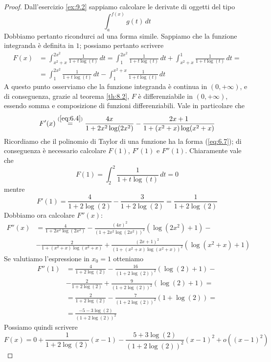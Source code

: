 \begin{proof}
    Dall'esercizio \ref{ex:9.2} sappiamo calcolare le derivate di oggetti del tipo
    \[
    \int_{a}^{f(x)} g(t)\, dt
    \]
    Dobbiamo pertanto ricondurci ad una forma simile. Sappiamo che la funzione integranda è definita in $1$; possiamo pertanto scrivere
    \[
    \begin{split}
        F(x) & = \int_{x^2+x}^{2x^2}\frac{1}{1+t\log(t)}\, dt = \int_{1}^{2x^2}\frac{1}{1+t\log(t)}\, dt + \int_{x^2+x}^1\frac{1}{1+t\log(t)}\, dt = \\
        & = \int_1^{2x^2} \frac{1}{1+t\log(t)}\, dt -\int_1^{x^2+x}\frac{1}{1+t\log(t)}\, dt
    \end{split}
    \]
    A questo punto osserviamo che la funzione integranda è continua in $(0,+\infty)$, e di conseguenza, grazie al teorema \ref{th:8.2}, $F$ è differenziabile in $(0,+\infty)$, essendo somma e composizione di funzioni differenziabili. Vale in particolare che
    \[
    F'(x) \overset{(\ref{eq:6.4})}{=} \frac{4x}{1+2x^2\log(2x^2)} -\frac{2x+1}{1+(x^2+x)\log(x^2+x)}
    \]
    Ricordiamo che il polinomio di Taylor di una funzione ha la forma (\ref{eq:6.7}); di conseguenza è necessario calcolare $F(1)$, $F'(1)$ e $F''(1)$. Chiaramente vale che
    \[
    F(1) = \int_2^2 \frac{1}{1+t\log(t)}\, dt = 0
    \]
    mentre
    \[
    F'(1) = \frac{4}{1+2\log(2)}-\frac{3}{1+2\log(2)} = \frac{1}{1+2\log(2)}
    \]
    Dobbiamo ora calcolare $F''(x)$:
    \[
    \begin{split}
        F''(x) & = \frac{4}{1+2x^2\log(2x^2)}-\frac{(4x)^2}{(1+2x^2\log(2x^2))^2}\left(\log(2x^2)+1\right)- \\
        & - \frac{2}{1+(x^2+x)\log(x^2+x)}+\frac{(2x+1)^2}{(1+(x^2+x)\log(x^2+x))^2}\left(\log(x^2+x)+1\right)
    \end{split}
    \]
    Se valutiamo l'espressione in $x_0=1$ otteniamo
    \[
    \begin{split}
        F''(1) & = \frac{4}{1+2\log(2)}-\frac{16}{(1+2\log(2))^2}(\log(2)+1)-\\
        & - \frac{2}{1+2\log(2)}+\frac{9}{(1+2\log(2))^2}(\log(2)+1) = \\
        & = \frac{2}{1+2\log(2)}-\frac{7}{(1+2\log(2))^2}(1+\log(2)) =\\
        & = \frac{-5-3\log(2)}{(1+2\log(2))^2}
    \end{split}
    \]
    Possiamo quindi scrivere
    \[
    F(x) = 0 + \frac{1}{1+2\log(2)}(x-1)-\frac{5+3\log(2)}{(1+2\log(2))^2}(x-1)^2 +o((x-1)^2)
    \]
\end{proof}
